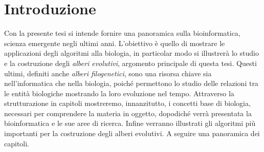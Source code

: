 \chapter*{Introduzione}
 
Con la presente tesi si intende fornire una panoramica sulla bioinformatica, scienza emergente negli ultimi anni. L'obiettivo è quello di mostrare le applicazioni degli algoritmi alla biologia, in particolar modo si illustrerà lo studio e la costruzione degli \textit{alberi evolutivi}, argomento principale di questa tesi.
\newline
Questi ultimi, definiti anche \textit{alberi filogenetici}, sono una risorsa chiave sia nell'informatica che nella biologia, poiché permettono lo studio delle relazioni tra le entità biologiche mostrando la loro evoluzione nel tempo.
\newline 
 Attraverso la strutturazione in capitoli mostreremo, innanzitutto, i concetti base di biologia, necessari per comprendere la materia in oggetto, dopodiché verrà presentata la bioinformatica e le sue aree di ricerca. Infine verranno illustrati gli algoritmi più importanti per la costruzione degli alberi evolutivi. A seguire una panoramica dei capitoli.
